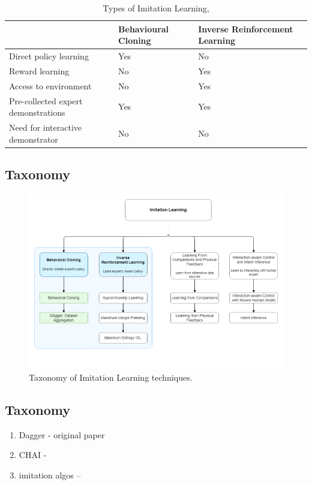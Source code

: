 \documentclass{article}
\begin{document}
\begingroup
\setlength{\tabcolsep}{6pt}
\begin{table}[h!]
	\centering
	\renewcommand{\arraystretch}{1.5} 
	\begin{tabular}{L{6cm} L{3cm} L{3cm}}
		\midrule[0.01pt]
		& \textbf{Behavioural Cloning} & \textbf{Inverse Reinforcement Learning}\\
		\midrule[0.01pt]
		Direct policy learning & Yes & No \\
		Reward learning & No & Yes \\
		Access to environment & No & Yes \\
		Pre-collected expert demonstrations & Yes & Yes \\
		Need for interactive demonstrator & No & No \\
		\midrule[0.01pt]
	\end{tabular}
	\caption{Types of Imitation Learning, \cite{yue2018imitation}}
	\label{tbl:BC_IRL}
\end{table}
\endgroup



\subsection{Taxonomy}

\begin{figure}[h]
	\centering
	\includegraphics[width=0.75\linewidth]{images/IRL_Taxonomy.png}
	\caption{Taxonomy of Imitation Learning techniques.}
	\label{fig:taxonomy}
\end{figure}

\subsection{Taxonomy}

\begin{enumerate}
	\item Dagger - original paper \cite{Dagger-Ross2010}
	\item CHAI - \cite{CHAI}
	\item imitation algos -- \cite{imitation-algos}
\end{enumerate}
\par
\end{document}
